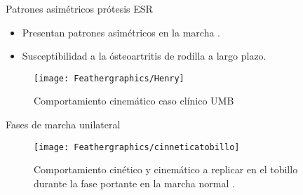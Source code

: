 \documentclass[10pt]{beamer}
\begin{document}
\begin{frame}{Patrones asimétricos prótesis ESR}

\begin{alertblock}{}

\begin{itemize}
\item {\scriptsize{}Presentan patrones asimétricos en la marcha \cite{Au2009,Martinez-Villalpando2011,Hill2013a,Bateni2002}.}{\scriptsize \par}
\item {\scriptsize{}Susceptibilidad a la ósteoartritis de rodilla a largo
plazo\cite{Grabowski2013}.}{\scriptsize \par}
\end{itemize}
\begin{figure}
\begin{centering}
\texttt{[image: Feathergraphics/Henry]}
\par\end{centering}
{\scriptsize{}\caption{Comportamiento cinemático caso clínico UMB}
}{\scriptsize \par}

\end{figure}

\end{alertblock}
\end{frame}

\begin{frame}{Fases de marcha unilateral}

\begin{center}
\begin{figure}
\begin{centering}
\texttt{[image: Feathergraphics/cinneticatobillo]}
\par\end{centering}
\caption{Comportamiento cinético y cinemático a replicar en el tobillo durante
la fase portante en la marcha normal \cite{Au2009}.}
\end{figure}
\par\end{center}

\end{frame}
\end{document}
